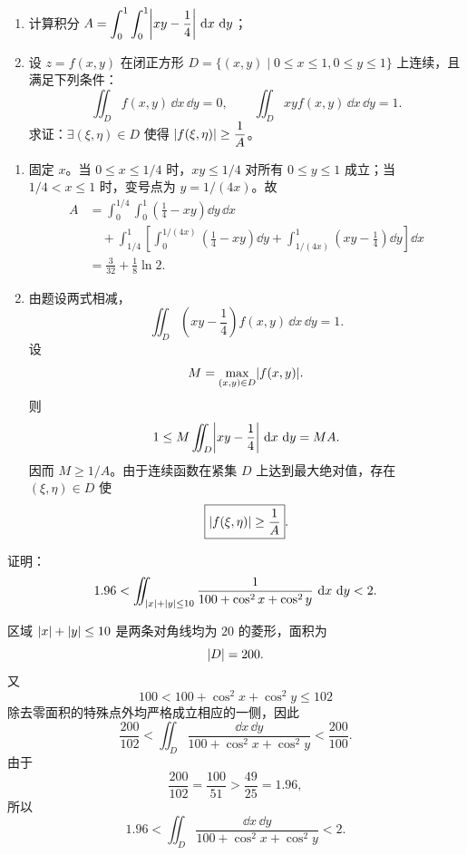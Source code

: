 \begin{xreferenceproblem}[3]
\begin{enumerate}[label=(\arabic*)]
    \item 计算积分 $\displaystyle A=\int_0^1\int_0^1\abs*{xy-\frac14}\,\dd x\,\dd y$；
    \item 设 $z=f(x,y)$ 在闭正方形 $D=\{(x,y)\mid0\le x\le1,0\le y\le1\}$ 上连续，且满足下列条件：
    \[
      \iint_D f(x,y)\,\dd x\,\dd y=0,
      \qquad
      \iint_D xyf(x,y)\,\dd x\,\dd y=1.
    \]
    求证：$\exists(\xi,\eta)\in D$ 使得 $\lvert f(\xi,\eta)\rvert\ge\dfrac1A$。
  \end{enumerate}
\end{xreferenceproblem}
\begin{xsolution}
\begin{enumerate}[label=(\arabic*)]
  \item 固定 $x$。当 $0\le x\le1/4$ 时，$xy\le1/4$ 对所有 $0\le y\le1$ 成立；当 $1/4<x\le1$ 时，变号点为 $y=1/(4x)$。故
  \begin{align*}
    A&=\int_0^{1/4}\int_0^1\left(\frac14-xy\right)\dd y\,\dd x\\
     &\quad+\int_{1/4}^1\left[
      \int_0^{1/(4x)}\left(\frac14-xy\right)\dd y
      +\int_{1/(4x)}^1\left(xy-\frac14\right)\dd y
    \right]\dd x\\
    &=\boxed{\frac3{32}+\frac18\ln2}.
  \end{align*}

  \item 由题设两式相减，
  \[
    \iint_D\left(xy-\frac14\right)f(x,y)\,\dd x\,\dd y=1.
  \]
  设
  \[
    M=\max_{(x,y)\in D}\lvert f(x,y)\rvert.
  \]
  则
  \[
    1\le M\iint_D\abs*{xy-\frac14}\,\dd x\,\dd y=MA.
  \]
  因而 $M\ge1/A$。由于连续函数在紧集 $D$ 上达到最大绝对值，存在 $(\xi,\eta)\in D$ 使
  \[
    \boxed{\lvert f(\xi,\eta)\rvert\ge\frac1A}.
  \]
\end{enumerate}
\end{xsolution}


\begin{xreferenceproblem}[4]
证明：
  \[
    1.96<\iint_{\lvert x\rvert+\lvert y\rvert\le10}\frac1{100+\cos^2x+\cos^2y}\,\mathop{}\!\mathrm{d} x\,\mathop{}\!\mathrm{d} y<2.
  \]
\end{xreferenceproblem}
\begin{xsolution}
区域 $\lvert x\rvert+\lvert y\rvert\le10$ 是两条对角线均为 $20$ 的菱形，面积为
\[
  \lvert D\rvert=200.
\]
又
\[
  100<100+\cos^2x+\cos^2y\le102
\]
除去零面积的特殊点外均严格成立相应的一侧，因此
\[
  \frac{200}{102}<
  \iint_D\frac{\dd x\,\dd y}{100+\cos^2x+\cos^2y}
  <\frac{200}{100}.
\]
由于
\[
  \frac{200}{102}=\frac{100}{51}>\frac{49}{25}=1.96,
\]
所以
\[
  \boxed{1.96<\iint_D\frac{\dd x\,\dd y}{100+\cos^2x+\cos^2y}<2}.
\]
\end{xsolution}


